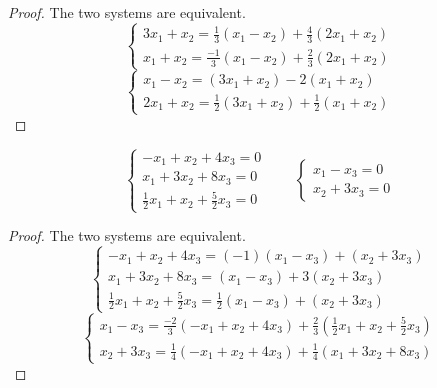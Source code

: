 \begin{proof}
    The two systems are equivalent.
    \[
        \begin{cases}
            3x_{1} + x_{2} = \frac{1}{3}(x_{1} - x_{2}) + \frac{4}{3}(2x_{1} + x_{2}) \\
            x_{1} + x_{2} =  \frac{-1}{3}(x_{1} - x_{2}) + \frac{2}{3}(2x_{1} + x_{2})
        \end{cases}
    \]
    \[
        \begin{cases}
            x_{1} - x_{2} = (3x_{1} + x_{2}) - 2(x_{1} + x_{2}) \\
            2x_{1} + x_{2} = \frac{1}{2}(3x_{1} + x_{2}) + \frac{1}{2}(x_{1} + x_{2})
        \end{cases}
    \]
\end{proof}

\begin{exercise}
    \[
        \begin{cases}
            -x_{1} + x_{2} + 4x_{3} = 0 \\
            x_{1} + 3x_{2} + 8x_{3} = 0 \\
            \frac{1}{2}x_{1} + x_{2} + \frac{5}{2}x_{3} = 0
        \end{cases}
        \qquad
        \begin{cases}
            x_{1} - x_{3} = 0 \\
            x_{2} + 3x_{3} = 0
        \end{cases}
    \]
\end{exercise}

\begin{proof}
    The two systems are equivalent.
    \[
        \begin{cases}
            -x_{1} + x_{2} + 4x_{3} = (-1)(x_{1} - x_{3}) + (x_{2} + 3x_{3}) \\
            x_{1} + 3x_{2} + 8x_{3} = (x_{1} - x_{3}) + 3(x_{2} + 3x_{3})    \\
            \frac{1}{2}x_{1} + x_{2} + \frac{5}{2}x_{3} = \frac{1}{2}(x_{1} - x_{3}) + (x_{2} + 3x_{3})
        \end{cases}
    \]
    \[
        \begin{cases}
            x_{1} - x_{3} = \frac{-2}{3}(-x_{1} + x_{2} + 4x_{3}) + \frac{2}{3}(\frac{1}{2}x_{1} + x_{2} + \frac{5}{2}x_{3}) \\
            x_{2} + 3x_{3} = \frac{1}{4}(-x_{1} + x_{2} + 4x_{3}) + \frac{1}{4}(x_{1} + 3x_{2} + 8x_{3})
        \end{cases}
    \]
\end{proof}

